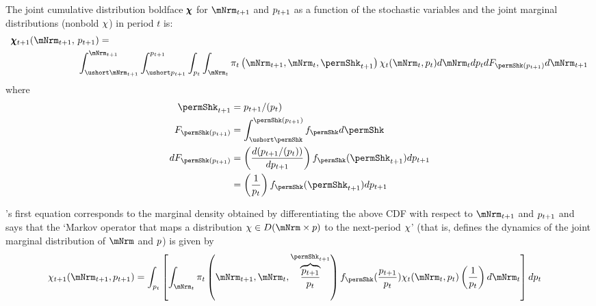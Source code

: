 \documentclass[\econtexRoot/BufferStockTheory]{subfiles}
\begin{document}
The joint cumulative distribution boldface $\pmb{\chi}$ for $\mNrmNxt$ and $p_{t+1}$ as a function of the stochastic variables and the joint marginal distributions (nonbold $\chi$) in period $t$ is:
\begin{equation}
  \begin{aligned} \label{eq:MeasTrnstCDF}
  \pmb{\mpPrb}_{t+1}(\mNrmNxt,~& \permLvlPrbNxt) =  \\ &
                                          \int_{\mNrmNxtBot}^{\mNrmNxt}
                                          \int_{\permLvlPrbNxtBot}^{\permLvlPrbNxt}
                                          \int_{\permLvlPrbNow} 
                                          \int_{\mNrmNow} \lomdkPrb_{t}\left(\mNrmNxt,\mNrmNow,\permShkPrbNxt\right)\mpPrb_{t}(\mNrmNow,\permLvlPrbNow)  d \mNrmNow                                                                                     d \permLvlPrbNow
                                                d F_{\permShk(\permLvlPrbNxt)}
                                                d \mNrmNxt \notag
\end{aligned}\end{equation}
where 
\begin{align*}
  \permShkPrbNxt & = \permLvlPrbNxt/(\PermGroFac \permLvlPrbNow) 
\\    F_{\permShk(\permLvlPrbNxt)} & = \int_{\permShkPrbBot}^{\permShk(\permLvlPrbNxt)} f_{\permShk} d\permShk
    \\ dF_{\permShk(\permLvlPrbNxt)} & = \left(\frac{d (\permLvlPrbNxt/(\PermGroFac \permLvlPrbNow))}{d\permLvlPrbNxt}
                             \right)f_{\permShk}(\permShkPrbNxt) d \permLvlPrbNxt 
\\ & = \left(\frac{1}{\PermGroFac \permLvlPrbNow}                             \right)f_{\permShk}(\permShkPrbNxt) d \permLvlPrbNxt 
  \end{align*}

\cite{harmenbergInvariant}'s first equation corresponds to the marginal density obtained by differentiating the above CDF with respect to $\mNrmNxt$ and $p_{t+1}$ and says that the `Markov operator that maps a distribution $\mpPrb \in D(\mNrm \times \permLvlPrb)$ to the next-period $\chi$' (that is, defines the dynamics of the joint marginal distribution of $\mNrm$ and $p$) is given by
\begin{align} \label{eq:MeasTrnst}
\mpPrb_{t+1}(\mNrmNxt,\permLvlPrbNxt) & =
                                          \int_{\permLvlPrbNow} \left[
                                           \int_{\mNrmNow} \lomdkPrb_{t}\left(\mNrmNxt,\mNrmNow,
                                           \overbrace{\frac{\permLvlPrbNxt}{\PermGroFac \permLvlPrbNow}}^{\permShkPrbNxt}\right)\permShkRawPrb(\frac{\permLvlPrbNxt}{\PermGroFac \permLvlPrbNow})\mpPrb_{t}(\mNrmNow,\permLvlPrbNow)\left(\frac{1}{\PermGroFac \permLvlPrbNow}\right)  d \mNrmNow
                                          \right] d \permLvlPrbNow
\end{align}
\newcommand{\nPermShk}{\texttt{i}}\newcommand{\nmNrmVecNow}{\texttt{j}}\newcommand{\nmNrmVecNxt}{\texttt{k}}\newcommand{\npermLvlNow}{\texttt{n}}\newcommand{\npermLvlNxt}{\texttt{q}}
\end{document}
